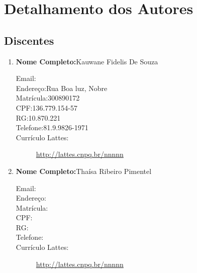 \documentclass[a4paper,12pt]{article} %
\begin{document}
\section*{Detalhamento dos Autores}

\subsection*{Discentes}

\begin{enumerate}
    \item \textbf{Nome Completo:}Kauwane Fidelis De Souza
    \begin{description}
        \item [Email:] 
        \item [Endereço:Rua Boa luz, Nobre]
        \item [Matrícula:300890172]
        \item [CPF:136.779.154-57]
        \item [RG:10.870.221]
        \item [Telefone:81.9.9826-1971]
        \item [Currículo Lattes:] \url{http://lattes.cnpq.br/nnnnn}
    \end{description}

\item \textbf{Nome Completo:}Thaísa Ribeiro Pimentel
    \begin{description}
        \item [Email:] 
        \item [Endereço:]
        \item [Matrícula:]
        \item [CPF:]
        \item [RG:]
        \item [Telefone:]
        \item [Currículo Lattes:] \url{http://lattes.cnpq.br/nnnnn}
    \end{description}



\end{enumerate}
\end{document}
